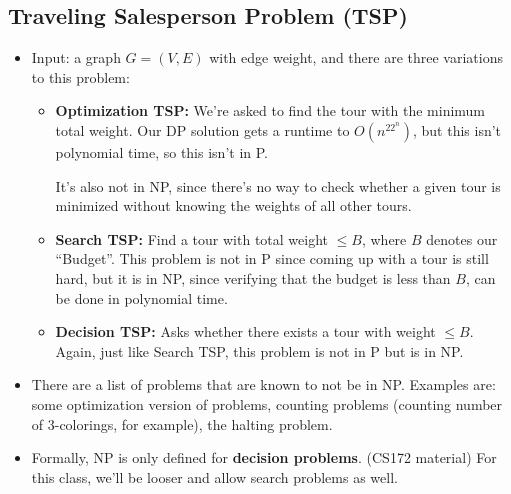 \subsection{Traveling Salesperson Problem (TSP)}
\begin{itemize}
	\item Input: a graph \(G = (V, E)\) with edge weight, and there are three variations to this problem:
		\begin{itemize}
			\item \textbf{Optimization TSP:} We're asked to find the tour with the minimum total weight. Our 
				DP solution gets a runtime to \(O(n^22^{n})\), but this isn't polynomial time, so this isn't in P.

				It's also not in NP, since there's no way to check whether a given tour is minimized 
				without knowing the weights of all other tours.
			\item \textbf{Search TSP:} Find a tour with total weight \(\le B\), where \(B\) denotes our
				``Budget''. This problem is not in P since coming up with a tour is still hard, but 
				it is in NP, since verifying that the budget is less than \(B\), can be done in polynomial time.  
				
			\item \textbf{Decision TSP:} Asks whether there exists a tour with weight \(\le B\). Again, just 
				like Search TSP, this problem is not in P but is in NP. 
		\end{itemize}
	\item There are a list of problems that are known to not be in NP. Examples are: some optimization version 
		of problems, counting problems (counting number of 3-colorings, for example), the halting problem.
	\item Formally, NP is only defined for \textbf{decision problems}. (CS172 material) For this class, 
		we'll be looser and allow search problems as well. 
\end{itemize}
